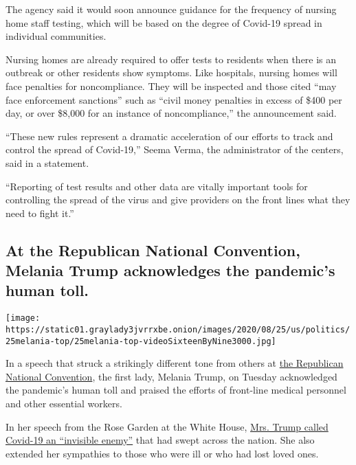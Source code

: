 The agency said it would soon announce guidance for the frequency of
nursing home staff testing, which will be based on the degree of
Covid-19 spread in individual communities.

Nursing homes are already required to offer tests to residents when
there is an outbreak or other residents show symptoms. Like hospitals,
nursing homes will face penalties for noncompliance. They will be
inspected and those cited ``may face enforcement sanctions'' such as
``civil money penalties in excess of \$400 per day, or over \$8,000 for
an instance of noncompliance,'' the announcement said.

``These new rules represent a dramatic acceleration of our efforts to
track and control the spread of Covid-19,'' Seema Verma, the
administrator of the centers, said in a statement.

``Reporting of test results and other data are vitally important tools
for controlling the spread of the virus and give providers on the front
lines what they need to fight it.''

\hypertarget{at-the-republican-national-convention-melania-trump-acknowledges-the-pandemics-human-toll}{%
\subsection{At the Republican National Convention, Melania Trump
acknowledges the pandemic's human
toll.}\label{at-the-republican-national-convention-melania-trump-acknowledges-the-pandemics-human-toll}}

\texttt{[image: https://static01.graylady3jvrrxbe.onion/images/2020/08/25/us/politics/25melania-top/25melania-top-videoSixteenByNine3000.jpg]}

In a speech that struck a strikingly different tone from others at
\href{https://www.nytimes3xbfgragh.onion/live/2020/08/25/us/rnc-convention-election?action=click\&module=Spotlight\&pgtype=Homepage\#mike-pompeo-in-a-break-with-state-dept-protocol-praised-trumps-foreign-policy-record-from-jerusalem}{the
Republican National Convention}, the first lady, Melania Trump, on
Tuesday acknowledged the pandemic's human toll and praised the efforts
of front-line medical personnel and other essential workers.

In her speech from the Rose Garden at the White House,
\href{https://www.nytimes3xbfgragh.onion/2020/08/25/us/politics/melania-trump.html?action=click\&module=RelatedLinks\&pgtype=Article}{Mrs.
Trump called Covid-19 an ``invisible enemy''} that had swept across the
nation. She also extended her sympathies to those who were ill or who
had lost loved ones.

